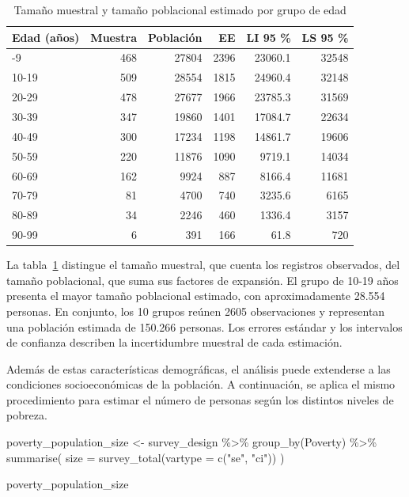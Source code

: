 \documentclass[
  spanish,
  11pt,
  letterpaper,
  oneside,
  open=any]{scrbook}
\newenvironment{Shaded}{\begin{snugshade}}{\end{snugshade}}
\newcommand{\AttributeTok}[1]{\textcolor[rgb]{0.40,0.45,0.13}{#1}}
\newcommand{\FunctionTok}[1]{\textcolor[rgb]{0.28,0.35,0.67}{#1}}
\newcommand{\NormalTok}[1]{\textcolor[rgb]{0.00,0.23,0.31}{#1}}
\newcommand{\OtherTok}[1]{\textcolor[rgb]{0.00,0.23,0.31}{#1}}
\newcommand{\SpecialCharTok}[1]{\textcolor[rgb]{0.37,0.37,0.37}{#1}}
\newcommand{\StringTok}[1]{\textcolor[rgb]{0.13,0.47,0.30}{#1}}
\begin{document}
{

\begin{longtable}[]{@{}lrrrrr@{}}

\caption{\label{tbl-tamano-edad}Tamaño muestral y tamaño poblacional
estimado por grupo de edad}

\tabularnewline

\toprule\noalign{}
Edad (años) & Muestra & Población & EE & LI 95 \% & LS 95 \% \\
\midrule\noalign{}
\endhead
\bottomrule\noalign{}
\endlastfoot
0-9 & 468 & 27804 & 2396 & 23060.1 & 32548 \\
10-19 & 509 & 28554 & 1815 & 24960.4 & 32148 \\
20-29 & 478 & 27677 & 1966 & 23785.3 & 31569 \\
30-39 & 347 & 19860 & 1401 & 17084.7 & 22634 \\
40-49 & 300 & 17234 & 1198 & 14861.7 & 19606 \\
50-59 & 220 & 11876 & 1090 & 9719.1 & 14034 \\
60-69 & 162 & 9924 & 887 & 8166.4 & 11681 \\
70-79 & 81 & 4700 & 740 & 3235.6 & 6165 \\
80-89 & 34 & 2246 & 460 & 1336.4 & 3157 \\
90-99 & 6 & 391 & 166 & 61.8 & 720 \\

\end{longtable}

}

La tabla~\ref{tbl-tamano-edad} distingue el tamaño muestral, que cuenta
los registros observados, del tamaño poblacional, que suma sus factores
de expansión. El grupo de 10-19 años presenta el mayor tamaño
poblacional estimado, con aproximadamente 28.554 personas. En conjunto,
los 10 grupos reúnen 2605 observaciones y representan una población
estimada de 150.266 personas. Los errores estándar y los intervalos de
confianza describen la incertidumbre muestral de cada estimación.

Además de estas características demográficas, el análisis puede
extenderse a las condiciones socioeconómicas de la población. A
continuación, se aplica el mismo procedimiento para estimar el número de
personas según los distintos niveles de pobreza.

\begin{Shaded}
\begin{Highlighting}[]
\NormalTok{poverty\_population\_size }\OtherTok{\textless{}{-}}\NormalTok{ survey\_design }\SpecialCharTok{\%\textgreater{}\%}
  \FunctionTok{group\_by}\NormalTok{(Poverty) }\SpecialCharTok{\%\textgreater{}\%}
  \FunctionTok{summarise}\NormalTok{(}
    \AttributeTok{size =} \FunctionTok{survey\_total}\NormalTok{(}\AttributeTok{vartype =} \FunctionTok{c}\NormalTok{(}\StringTok{"se"}\NormalTok{, }\StringTok{"ci"}\NormalTok{))}
\NormalTok{  )}

\NormalTok{poverty\_population\_size}
\end{Highlighting}
\end{Shaded}
\end{document}
